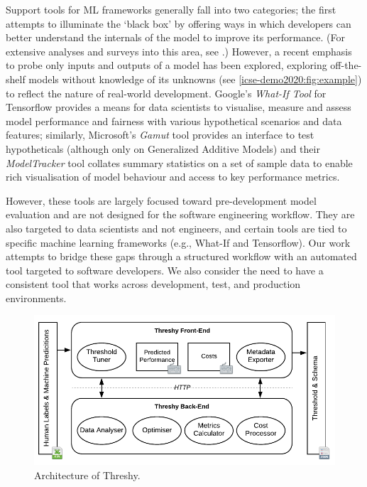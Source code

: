 Support tools for ML frameworks generally fall into two categories; the first attempts to illuminate the `black box' by offering ways in which developers can better understand the internals of the model to improve its performance. (For extensive analyses and surveys into this area, see \citep{Hohman2018VisualAI,Patel:2008:ISM:1357054.1357160}.) However, a recent emphasis to probe only inputs and outputs of a model has been explored, exploring off-the-shelf models without  knowledge of its unknowns (see \cref{icse-demo2020:fig:example}) to reflect the nature of real-world development. Google's \textit{What-If Tool} \citep{DBLP:journals/corr/abs-1907-04135} for Tensorflow provides a means for data scientists to visualise, measure and assess model performance and fairness with various hypothetical scenarios and data features; similarly, Microsoft's \textit{Gamut} tool  \citep{hohman2019gamut} provides an interface to test hypotheticals (although only on Generalized Additive Models) and their  \textit{ModelTracker} tool \citep{amershi2015modeltracker} collates summary statistics on a set of sample data to enable rich visualisation of model behaviour and access to key performance metrics.

However, these tools are largely focused toward pre-development model evaluation and are not designed for the software engineering workflow. They are also targeted to data scientists and not engineers, and certain tools are tied to specific machine learning frameworks (e.g., What-If and Tensorflow). Our work attempts to bridge these gaps through a structured workflow with an automated tool targeted to software developers. We also consider the need to have a consistent tool that works across development, test, and production environments.  

\begin{figure}[t!]
    \centering
    \includegraphics[width=\linewidth]{architecture}
    \caption{Architecture of Threshy.}
    \label{icse-demo2020:fig:implementation}
    \vspace{-2em}
\end{figure}

